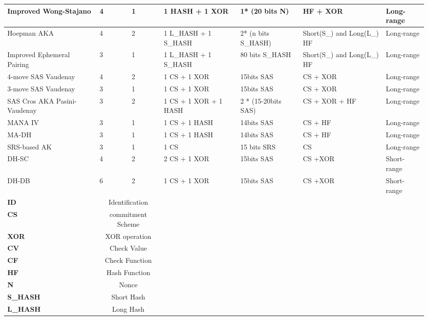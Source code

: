 \begin{table}[ht]
{\begin{tabular}{ | p{2cm} | p{1.4cm} | p{1.4cm} | p{2cm} | p{2.2cm} | p{2cm} | p{2cm}| }
Improved Wong-Stajano & 4	& 1	& 1 HASH + 1 XOR	 & 1* (20 bits N) &	 HF + XOR & Long-range \\ \hline 

Hoepman AKA & 4	& 2 &	 1 L\_HASH + 1 S\_HASH & 	2* (n bits S\_HASH) &	 Short(S\_) and Long(L\_) HF & Long-range \\ \hline 

Improved	Ephemeral Pairing & 3 &	 1 &	 1 L\_HASH + 1 S\_HASH &	80 bits S\_HASH & Short(S\_) and Long(L\_) HF & Long-range \\ \hline 
 
4-move SAS Vaudenay & 4	& 2 & 1 CS + 1 XOR & 15bits SAS	& CS + XOR & Long-range\\ \hline 

3-move SAS Vaudenay & 3	& 1 & 1 CS + 1 XOR & 15bits SAS	& CS + XOR & Long-range\\ \hline 
 																				
SAS Cros AKA Pasini-Vaudenay &	3 &	2 &	1 CS + 1 XOR + 1 HASH & 2 * (15-20bits SAS) & CS + XOR + HF & Long-range\\ \hline 

MANA IV & 3 & 1 & 1 CS + 1 HASH & 14bits SAS & CS + HF & Long-range\\ \hline 

MA-DH & 3 &	1 &	1 CS + 1 HASH & 14bits SAS & CS + HF & Long-range \\ \hline 

 SRS-based AK & 3 & 1 &  1 CS &	 15 bits SRS &	 CS & Long-range \\\hline 

DH-SC & 4 &	2 &	2 CS + 1 XOR & 15bits SAS & CS +XOR & Short-range\\ \hline 

DH-DB & 6 &	2 &	1 CS + 1 XOR & 15bits SAS & CS +XOR & Short-range\\ \hline \hline 

\textbf{ID} &\multicolumn{2}{c}{Identification} & & & & \\
\textbf{CS} &\multicolumn{2}{c}{commitment Scheme} & & & & \\
\textbf{XOR} &\multicolumn{2}{c}{XOR operation} & & & & \\
\textbf{CV} &\multicolumn{2}{c}{Check Value} & & & & \\
\textbf{CF} &\multicolumn{2}{c}{Check Function} & & & & \\
\textbf{HF} &\multicolumn{2}{c}{Hash Function} & & & & \\
\textbf{N} &\multicolumn{2}{c}{Nonce} & & & & \\
\textbf{S\_HASH} &\multicolumn{2}{c}{Short Hash} & & & & \\
\textbf{L\_HASH} &\multicolumn{2}{c}{Long Hash} & & & & \\ \hline
\end{tabular}
}
\end{table}


